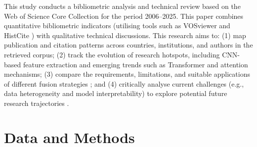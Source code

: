 \documentclass[]{interact}
\theoremstyle{plain}%
\theoremstyle{definition}
\theoremstyle{remark}
\DeclareRobustCommand{\DIFadd}[1]{{\protect\color{DIFaddcolor}\uwave{#1}}}
\DeclareRobustCommand{\DIFdel}[1]{{\protect\color{DIFdelcolor}\sout{#1}}}
\def\DIFadd#1{#1}%
\def\DIFdel#1{}%
\begin{document}
This study conducts a \DIFdel{systematic} bibliometric analysis and \DIFadd{technical} review based on the Web of Science Core Collection for the period 2006--2025. \DIFdel{Unlike} \DIFdel{previous} \DIFdel{studies} \DIFdel{that} \DIFdel{focus} \DIFdel{solely} \DIFdel{on} \DIFdel{algorithmic} \DIFdel{techniques} \DIFdel{or} \DIFdel{traditional} \DIFdel{reviews}\DIFdel{,} \DIFdel{this} \DIFadd{This} paper combines quantitative bibliometric indicators (\DIFdel{utilizing}\hspace{0.33em}\DIFadd{utilising} tools such as VOSviewer and HistCite \citep{9,10}) with qualitative technical discussions. This research aims to: (1) map \DIFdel{the} \DIFdel{global} \DIFdel{research} \DIFdel{landscape} \DIFdel{to} \DIFdel{identify} \DIFdel{core} \DIFadd{publication} \DIFadd{and} \DIFadd{citation} \DIFadd{patterns} \DIFadd{across} countries, institutions, and \DIFdel{high-impact} authors \DIFadd{in} \DIFadd{the} \DIFadd{retrieved} \DIFadd{corpus}; (2) track the evolution of research hotspots, \DIFdel{particularly} \DIFdel{the} \DIFdel{shift} \DIFdel{from} \DIFadd{including} CNN-based feature extraction \DIFdel{to} \DIFadd{and} emerging trends such as Transformer and attention mechanisms; (3) compare the \DIFdel{effectiveness} \DIFadd{requirements}\DIFadd{,} \DIFadd{limitations}\DIFadd{,} \DIFadd{and} \DIFadd{suitable} \DIFadd{applications} of different fusion strategies\DIFdel{,} \DIFdel{highlighting} \DIFdel{the} \DIFdel{dominance} \DIFdel{of} \DIFdel{feature} \DIFdel{fusion}; and (4) critically \DIFdel{analyze} \DIFadd{analyse} current challenges (e.g., data heterogeneity and model interpretability) to explore potential future research trajectories {\hypersetup{citecolor=red}\color{red}\citep{ORIGli2024feddiff}}.

\section{Data and Methods}
\end{document}
